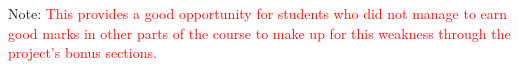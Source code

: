 \documentclass[12pt	]{article}
\begin{document}
Note: \textcolor{red}{This provides a good opportunity for students who did not manage to earn good marks in other parts of the course to make up for this weakness through the project's bonus sections.}












\newpage


\end{document}
